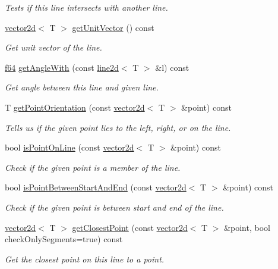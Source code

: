 \begin{DoxyCompactItemize}
\begin{DoxyCompactList}\small\item\em Tests if this line intersects with another line. \end{DoxyCompactList}\item 
\hyperlink{classirr_1_1core_1_1vector2d}{vector2d}$<$ T $>$ \hyperlink{classirr_1_1core_1_1line2d_ae3f1a52b3057168c41d283d100d13c79}{get\+Unit\+Vector} () const
\begin{DoxyCompactList}\small\item\em Get unit vector of the line. \end{DoxyCompactList}\item 
\hyperlink{namespaceirr_a1325b02603ad449f92c68fc640af9b28}{f64} \hyperlink{classirr_1_1core_1_1line2d_a0342a0b17c9318cb1eb1183cb91abaf4}{get\+Angle\+With} (const \hyperlink{classirr_1_1core_1_1line2d}{line2d}$<$ T $>$ \&l) const
\begin{DoxyCompactList}\small\item\em Get angle between this line and given line. \end{DoxyCompactList}\item 
T \hyperlink{classirr_1_1core_1_1line2d_a85405d08c6e3ea55cdb39b60484f7275}{get\+Point\+Orientation} (const \hyperlink{classirr_1_1core_1_1vector2d}{vector2d}$<$ T $>$ \&point) const
\begin{DoxyCompactList}\small\item\em Tells us if the given point lies to the left, right, or on the line. \end{DoxyCompactList}\item 
bool \hyperlink{classirr_1_1core_1_1line2d_a00fcd43ae43b8b7e249b32206aaa22ff}{is\+Point\+On\+Line} (const \hyperlink{classirr_1_1core_1_1vector2d}{vector2d}$<$ T $>$ \&point) const
\begin{DoxyCompactList}\small\item\em Check if the given point is a member of the line. \end{DoxyCompactList}\item 
bool \hyperlink{classirr_1_1core_1_1line2d_a5c986f9749f57364757f0f6c749922ce}{is\+Point\+Between\+Start\+And\+End} (const \hyperlink{classirr_1_1core_1_1vector2d}{vector2d}$<$ T $>$ \&point) const
\begin{DoxyCompactList}\small\item\em Check if the given point is between start and end of the line. \end{DoxyCompactList}\item 
\hyperlink{classirr_1_1core_1_1vector2d}{vector2d}$<$ T $>$ \hyperlink{classirr_1_1core_1_1line2d_af049709fbc870bdc317ec27df95280cb}{get\+Closest\+Point} (const \hyperlink{classirr_1_1core_1_1vector2d}{vector2d}$<$ T $>$ \&point, bool check\+Only\+Segments=true) const
\begin{DoxyCompactList}\small\item\em Get the closest point on this line to a point. \end{DoxyCompactList}\end{DoxyCompactItemize}

